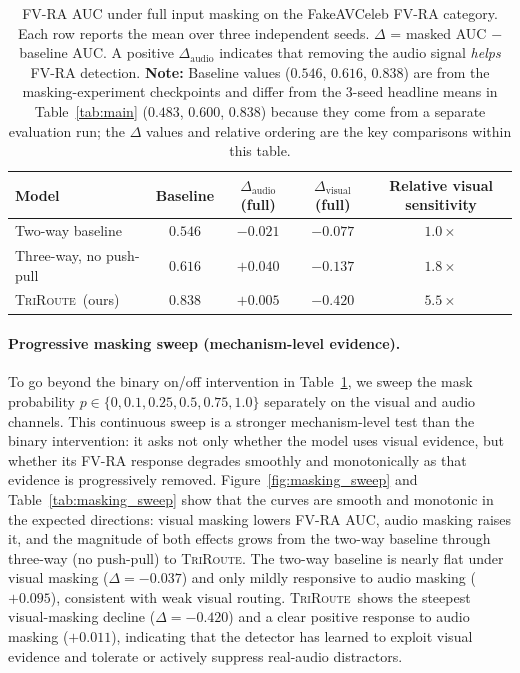 \documentclass{article}
\newcommand{\method}{\textsc{TriRoute}}
\begin{document}
\begin{table}[t]
    \centering
    \caption{FV-RA AUC under full input masking on the FakeAVCeleb FV-RA category. Each row reports the mean over three independent seeds. $\Delta$ = masked AUC $-$ baseline AUC. A positive $\Delta_{\mathrm{audio}}$ indicates that removing the audio signal \emph{helps} FV-RA detection. \textbf{Note:} Baseline values ($0.546$, $0.616$, $0.838$) are from the masking-experiment checkpoints and differ from the 3-seed headline means in Table~\ref{tab:main} ($0.483$, $0.600$, $0.838$) because they come from a separate evaluation run; the $\Delta$ values and relative ordering are the key comparisons within this table.}
    \label{tab:perturbation}
    \small
    \begin{tabular}{lcccc}
        \toprule
        Model & Baseline & $\Delta_{\mathrm{audio}}$ (full) & $\Delta_{\mathrm{visual}}$ (full) & Relative visual sensitivity \\
        \midrule
        Two-way baseline        & $0.546$ & $-0.021$ & $-0.077$ & $1.0\times$ \\
        Three-way, no push-pull & $0.616$ & $+0.040$ & $-0.137$ & $1.8\times$ \\
        \method\ (ours) & $\mathbf{0.838}$ & $\mathbf{+0.005}$ & $\mathbf{-0.420}$ & $\mathbf{5.5\times}$ \\
        \bottomrule
    \end{tabular}
\end{table}

\paragraph{Progressive masking sweep (mechanism-level evidence).}
To go beyond the binary on/off intervention in Table~\ref{tab:perturbation}, we sweep the mask probability $p \in \{0, 0.1, 0.25, 0.5, 0.75, 1.0\}$ separately on the visual and audio channels. This continuous sweep is a stronger mechanism-level test than the binary intervention: it asks not only whether the model uses visual evidence, but whether its FV-RA response degrades smoothly and monotonically as that evidence is progressively removed. Figure~\ref{fig:masking_sweep} and Table~\ref{tab:masking_sweep} show that the curves are smooth and monotonic in the expected directions: visual masking lowers FV-RA AUC, audio masking raises it, and the magnitude of both effects grows from the two-way baseline through three-way (no push-pull) to \method. The two-way baseline is nearly flat under visual masking ($\Delta = -0.037$) and only mildly responsive to audio masking ($+0.095$), consistent with weak visual routing. \method\ shows the steepest visual-masking decline ($\Delta = -0.420$) and a clear positive response to audio masking ($+0.011$), indicating that the detector has learned to exploit visual evidence and tolerate or actively suppress real-audio distractors.
\end{document}
